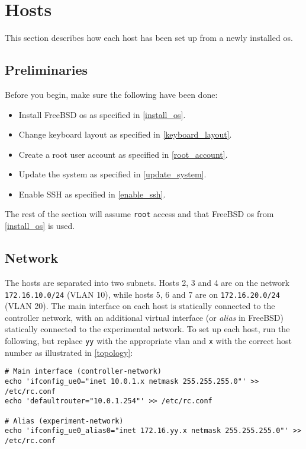 \chapter{Hosts}

This section describes how each host has been set up from a newly installed \gls{os}.

\section{Preliminaries}

Before you begin, make sure the following have been done:

\begin{itemize}
    \item Install FreeBSD \gls{os} as specified in \ref{install_os}.
    \item Change keyboard layout as specified in \ref{keyboard_layout}.
    \item Create a root user account as specified in \ref{root_account}.
    \item Update the system as specified in \ref{update_system}.
    \item Enable SSH as specified in \ref{enable_ssh}.
\end{itemize}

The rest of the section will assume \lstinline{root} access and that FreeBSD \gls{os} from \ref{install_os} is used.


\section{Network}

The hosts are separated into two subnets. Hosts 2, 3 and 4 are on the network \lstinline{172.16.10.0/24} (VLAN 10), while hosts 5, 6 and 7 are on \lstinline{172.16.20.0/24} (VLAN 20). The main interface on each host is statically connected to the controller network, with an additional virtual interface (or \textit{alias} in FreeBSD) statically connected to the experimental network. To set up each host, run the following, but replace \lstinline{yy} with the appropriate \gls{vlan} and \lstinline{x} with the correct host number as illustrated in \ref{topology}:

\begin{lstlisting}
# Main interface (controller-network)
echo 'ifconfig_ue0="inet 10.0.1.x netmask 255.255.255.0"' >> /etc/rc.conf
echo 'defaultrouter="10.0.1.254"' >> /etc/rc.conf

# Alias (experiment-network)
echo 'ifconfig_ue0_alias0="inet 172.16.yy.x netmask 255.255.255.0"' >> /etc/rc.conf
\end{lstlisting}

